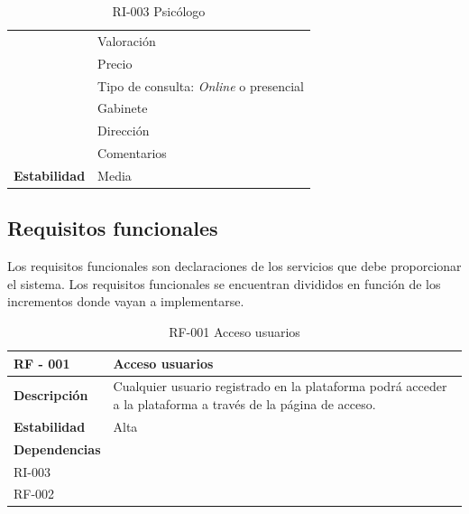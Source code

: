 \begin{table}[htpb]
\begin{tabularx}{\textwidth}{|l|X|}
                   & Valoración                                                                   \\ 
                   & Precio                                                                       \\ 
                   & Tipo de consulta: \textit{Online} o presencial                                        \\
                   & Gabinete                                                                     \\
                   & Dirección 
\\
				   & Comentarios
\\ \hline
\textbf{Estabilidad}        & Media                                                                        \\ \hline
\end{tabularx}
\caption{RI-003 Psicólogo}
\end{table}


\subsection{Requisitos funcionales}


Los requisitos funcionales son declaraciones de los servicios que debe proporcionar el sistema. Los requisitos funcionales se encuentran divididos en función de los incrementos donde vayan a implementarse\cite{sommerville}.




\begin{table}[htpb]
\centering
\begin{tabularx}{\textwidth}{|l|X|}
\hline
\textbf{RF - 001 }                               & \textbf{Acceso usuarios                                                                                             } \\ \hline
\textbf{Descripción}                             & Cualquier usuario registrado en la plataforma podrá acceder a la plataforma a través de la página de acceso. \\ \hline
\textbf{Estabilidad}                             & Alta                                                                                                         \\ \hline
\textbf{Dependencias} & \begin{tabular}[c]{@{}l@{}}RI-001 \\ RI-003 \\ RF-002\end{tabular}                                           \\ \hline
\end{tabularx}
\caption{RF-001 Acceso usuarios}
\end{table}


